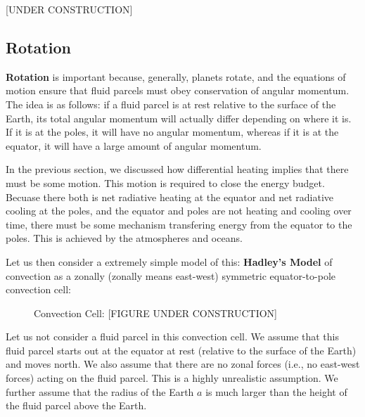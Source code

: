 [UNDER CONSTRUCTION]

\subsection{Rotation}

\textbf{Rotation} is important because, generally, planets rotate, and the equations of motion ensure that fluid parcels must obey conservation of angular momentum. The idea is as follows: if a fluid parcel is at rest relative to the surface of the Earth, its total angular momentum will actually differ depending on where it is. If it is at the poles, it will have no angular momentum, whereas if it is at the equator, it will have a large amount of angular momentum.

In the previous section, we discussed how differential heating implies that there must be some motion. This motion is required to close the energy budget. Becuase there both is net radiative heating at the equator and net radiative cooling at the poles, and the equator and poles are not heating and cooling over time, there must be some mechanism transfering energy from the equator to the poles. This is achieved by the atmospheres and oceans.

Let us then consider a extremely simple model of this: \textbf{Hadley's Model} of convection as a zonally (zonally means east-west) symmetric equator-to-pole convection cell:
\begin{figure}[H]
    \centering
    \caption{Convection Cell: [FIGURE UNDER CONSTRUCTION]}
\end{figure}

Let us not consider a fluid parcel in this convection cell. We assume that this fluid parcel starts out at the equator at rest (relative to the surface of the Earth) and moves north. We also assume that there are no zonal forces (i.e., no east-west forces) acting on the fluid parcel. This is a highly unrealistic assumption. We further assume that the radius of the Earth $a$ is much larger than the height of the fluid parcel above the Earth.

